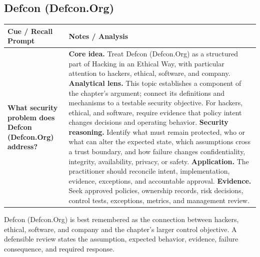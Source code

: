 \documentclass[11pt]{article}
\newcommand{\CornellHeader}{%
\rowcolor{Navy}\color{white}\bfseries Cue / Recall Prompt & \color{white}\bfseries Notes / Analysis\\\hline}
\newcommand{\CornellRow}[2]{%
\cellcolor{CueGray}\RaggedRight\textbf{#1} & \RaggedRight #2\\\hline}
\begin{document}
\subsection*{Defcon (Defcon.Org)}
\begin{longtable}{>{\RaggedRight\arraybackslash}p{}|>{\RaggedRight\arraybackslash}p{}}
\CornellHeader
\CornellRow{What security problem does Defcon (Defcon.Org) address?}{\textbf{Core idea.} Treat Defcon (Defcon.Org) as a structured part of Hacking in an Ethical Way, with particular attention to hackers, ethical, software, and company. \textbf{Analytical lens.} This topic establishes a component of the chapter's argument; connect its definitions and mechanisms to a testable security objective. For hackers, ethical, and software, require evidence that policy intent changes decisions and operating behavior. \textbf{Security reasoning.} Identify what must remain protected, who or what can alter the expected state, which assumptions cross a trust boundary, and how failure changes confidentiality, integrity, availability, privacy, or safety. \textbf{Application.} The practitioner should reconcile intent, implementation, evidence, exceptions, and accountable approval. \textbf{Evidence.} Seek approved policies, ownership records, risk decisions, control tests, exceptions, metrics, and management review.}
\end{longtable}
\begin{topicsummary}
Defcon (Defcon.Org) is best remembered as the connection between hackers, ethical, software, and company and the chapter's larger control objective. A defensible review states the assumption, expected behavior, evidence, failure consequence, and required response.
\end{topicsummary}
\end{document}
